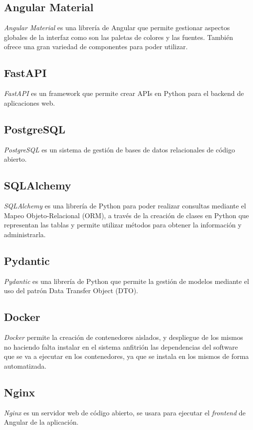 \subsection{Angular Material}
\textit{Angular Material} es una librería de Angular que permite gestionar aspectos globales de la interfaz como son las paletas de colores y las fuentes. También ofrece una gran variedad de componentes para poder utilizar.

\subsection{FastAPI}
\textit{FastAPI} es un framework que permite crear APIs en Python para el backend de aplicaciones web.

\subsection{PostgreSQL}
\textit{PostgreSQL} es un sistema de gestión de bases de datos relacionales de código abierto.

\subsection{SQLAlchemy}
\textit{SQLAlchemy} es una librería de Python para poder realizar consultas mediante el Mapeo Objeto-Relacional (ORM), a través de la creación de clases en Python que representan las tablas y permite utilizar métodos para obtener la información y administrarla.

\subsection{Pydantic}
\textit{Pydantic} es una librería de Python que permite la gestión de modelos mediante el uso del patrón Data Transfer Object (DTO).

\subsection{Docker}
\textit{Docker} permite la creación de contenedores aislados, y despliegue de los mismos no haciendo falta instalar en el sistema anfitrión las dependencias del software que se va a ejecutar en los contenedores, ya que se instala en los mismos de forma automatizada. 

\subsection{Nginx}
\textit{Nginx} es un servidor web de código abierto, se usara para ejecutar el \textit{frontend}  de Angular de la aplicación.



